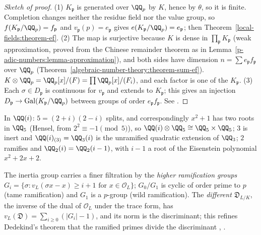 \begin{proof}[Sketch of proof]
(1) $K_\mathfrak{p}$ is generated over $\QQ_p$ by $K$, hence by $\theta$, so it is finite. Completion changes neither the residue field nor the value group, so $f(K_\mathfrak{p}/\QQ_p) = f_\mathfrak{p}$ and
$v_\mathfrak{p}(p) = e_\mathfrak{p}$ gives $e(K_\mathfrak{p}/\QQ_p) = e_\mathfrak{p}$; then Theorem~\ref{local-fields:theorem-ef}. (2) The map is surjective because $K$ is dense in $\prod_\mathfrak{p}K_\mathfrak{p}$ (weak
approximation, proved from the Chinese remainder theorem as in Lemma~\ref{p-adic-numbers:lemma-approximation}), and both sides have dimension $n = \sum e_\mathfrak{p}f_\mathfrak{p}$ over $\QQ_p$
(Theorem~\ref{algebraic-number-theory:theorem-sum-ef}). $K \otimes \QQ_p = \QQ_p[x]/(F) = \prod\QQ_p[x]/(F_i)$, and each factor is one of the $K_\mathfrak{p}$. (3) Each $\sigma \in D_\mathfrak{p}$ is continuous for
$v_\mathfrak{p}$ and extends to $K_\mathfrak{p}$; this gives an injection $D_\mathfrak{p} \to \mathrm{Gal}(K_\mathfrak{p}/\QQ_p)$ between groups of order $e_\mathfrak{p}f_\mathfrak{p}$. See \cite[Chapter II, \S 8--9]{neukirch-ant}.
\end{proof}

\begin{example}\label{local-fields:example-completions}
In $\QQ(i)$: $5 = (2 + i)(2 - i)$ splits, and correspondingly $x^2 + 1$ has two roots in $\QQ_5$ (Hensel, from $2^2 \equiv -1 \pmod 5$), so $\QQ(i) \otimes \QQ_5 \cong \QQ_5 \times \QQ_5$; $3$ is inert and
$\QQ(i)_{(3)} = \QQ_3(i)$ is the unramified quadratic extension of $\QQ_3$; $2$ ramifies and $\QQ_2(i) = \QQ_2(i - 1)$, with $i - 1$ a root of the Eisenstein polynomial $x^2 + 2x + 2$.
\end{example}

\begin{remark}\label{local-fields:remark-ramification-groups}
The inertia group carries a finer filtration by the \emph{higher ramification groups} $G_i = \{\sigma : v_L(\sigma x - x) \geq i + 1 \text{ for } x \in \mathcal{O}_L\}$; $G_0/G_1$ is cyclic of order prime to
$p$ (tame ramification) and $G_1$ is a $p$-group (wild ramification). The \emph{different} $\mathfrak{D}_{L/K}$, the inverse of the dual of $\mathcal{O}_L$ under the trace form, has
$v_L(\mathfrak{D}) = \sum_{i \geq 0}(|G_i| - 1)$, and its norm is the discriminant; this refines Dedekind's theorem that the ramified primes divide the discriminant \cite[Chapter III, \S 2]{neukirch-ant},
\cite{serre-local-fields}.
\end{remark}

